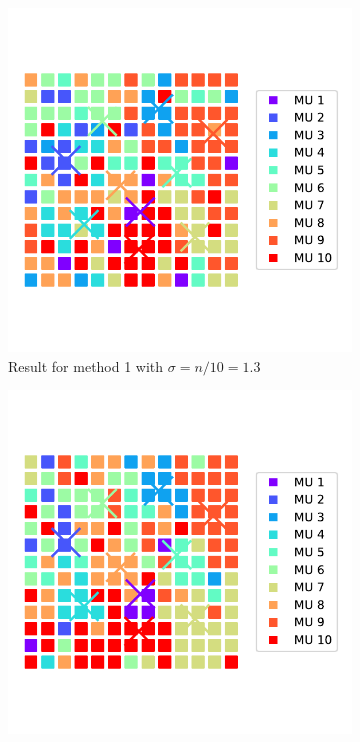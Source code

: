 \begin{figure}%
  \centering%
  \begin{subfigure}[t]{0.48\textwidth}%
    \centering%
    \includegraphics[width=\textwidth]{images/motor_unit_assignment/MU_fibre_distribution_13x13_10_2d_fiber_distribution.pdf}%
    \caption{Result for method 1 with $\sigma = n/10 = 1.3$}%
    \label{fig:MU_fibre_distribution_13x13_10_2d_fiber_distribution}%
  \end{subfigure}
  \quad
  \begin{subfigure}[t]{0.48\textwidth}%
    \centering%
    \includegraphics[width=\textwidth]{images/motor_unit_assignment/MU_fibre_distribution_13x13_10_2d_fiber_distribution_sigma.pdf}%

\end{subfigure}
\end{figure}
